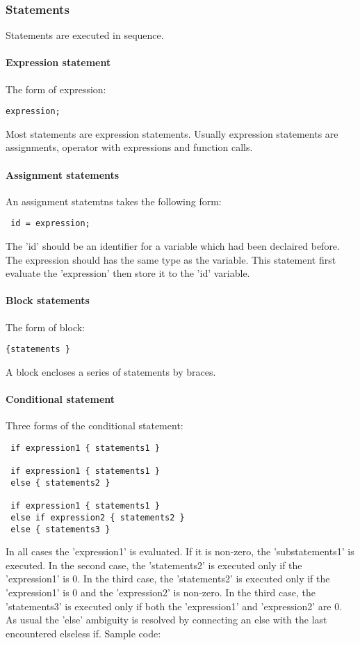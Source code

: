 \documentclass[12pt]{article} %
\begin{document}
\subsubsection{Statements}
Statements are executed in sequence.

\paragraph{Expression statement}
The form of expression:
\begin{lstlisting}
expression;
\end{lstlisting}

\noindent Most statements are expression statements. Usually expression statements are assignments, operator with expressions and  function calls.
\paragraph{Assignment statements}
An assignment statemtns takes the following form:
\begin{lstlisting}
 id = expression;
\end{lstlisting}

The 'id' should be  an identifier for  a variable which had been declaired before. The expression should has the same type as the variable. This statement first evaluate the 'expression' then store it to the 'id' variable.  


\paragraph{Block statements}
The form of block:
\begin{lstlisting}
{statements }
\end{lstlisting}
\noindent A block encloses a series of statements by braces.

\paragraph{Conditional statement}
Three forms of the conditional statement:
\begin{lstlisting}
 if expression1 { statements1 }

 if expression1 { statements1 } 
 else { statements2 }

 if expression1 { statements1 } 
 else if expression2 { statements2 }
 else { statements3 }
\end{lstlisting}
\noindent In all cases the 'expression1' is evaluated.  If it is non-zero, the  'substatements1' is executed. In the second case, the 'statements2' is executed only if the 'expression1' is 0. In the third case, the 'statements2' is executed only if the   'expression1' is 0 and the  'expression2' is non-zero.  In the third case, the 'statements3' is executed only if both the 'expression1' and 'expression2' are 0. As usual the 'else' ambiguity is resolved by connecting an else with the last encountered elseless if.  Sample code:
\end{document}
